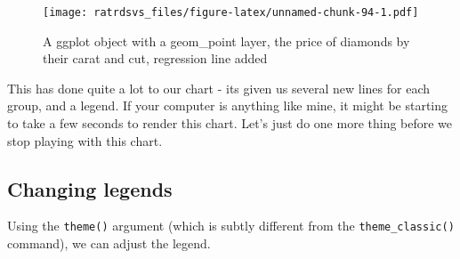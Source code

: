 \documentclass[
]{book}
\newenvironment{Shaded}{\begin{snugshade}}{\end{snugshade}}
\newcommand{\DataTypeTok}[1]{\textcolor[rgb]{0.13,0.29,0.53}{#1}}
\newcommand{\DecValTok}[1]{\textcolor[rgb]{0.00,0.00,0.81}{#1}}
\newcommand{\FloatTok}[1]{\textcolor[rgb]{0.00,0.00,0.81}{#1}}
\newcommand{\KeywordTok}[1]{\textcolor[rgb]{0.13,0.29,0.53}{\textbf{#1}}}
\newcommand{\NormalTok}[1]{#1}
\newcommand{\OperatorTok}[1]{\textcolor[rgb]{0.81,0.36,0.00}{\textbf{#1}}}
\newcommand{\OtherTok}[1]{\textcolor[rgb]{0.56,0.35,0.01}{#1}}
\newcommand{\StringTok}[1]{\textcolor[rgb]{0.31,0.60,0.02}{#1}}
\begin{document}
\begin{figure}
\centering
\texttt{[image: ratrdsvs\_files/figure-latex/unnamed-chunk-94-1.pdf]}
\caption{\label{fig:unnamed-chunk-94}A ggplot object with a geom\_point layer, the price of diamonds by their carat and cut, regression line added}
\end{figure}

This has done quite a lot to our chart - its given us several new lines for each group, and a legend. If your computer is anything like mine, it might be starting to take a few seconds to render this chart. Let's just do one more thing before we stop playing with this chart.

\hypertarget{gg_legend}{%
\subsection{Changing legends}\label{gg_legend}}

Using the \texttt{theme()} argument (which is subtly different from the \texttt{theme\_classic()} command), we can adjust the legend.

\begin{Shaded}
\end{Shaded}
\end{document}
